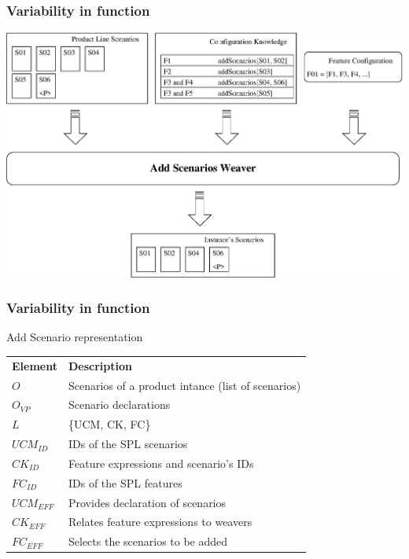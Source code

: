 \documentclass[xcolor=svgnames]{beamer}
\begin{document}
\begin{frame}
\frametitle{Variability in function}
\begin{center}
\includegraphics[scale=0.40]{img/select-weaver.eps}
\end{center}
\hyperlink{addScenario-weaver}{}
\end{frame}

\begin{frame}
\frametitle{Variability in function}
\begin{block}{Add Scenario representation }
\begin{scriptsize}
\begin{tabular}{p{0.6in}p{2.4in}}
   \hline\noalign{\smallskip}
  {\bf Element} & {\bf Description} \\
   \noalign{\smallskip}
   \hline
   \noalign{\smallskip}
   $O$             	& Scenarios of a product intance (list of scenarios) \\ 
   $O_{VP}$        	& Scenario declarations \\ 
   $L$             	& \{UCM, CK, FC\} \\ 
   $UCM_{ID}$ 	   	& IDs of the SPL scenarios \\ 
   $CK_{ID}$    	& Feature expressions and scenario's IDs\\  
   $FC_{ID}$    	& IDs of the SPL features \\ 
   $UCM_{EFF}$ 		& Provides declaration of scenarios \\  
   $CK_{EFF}$    	& Relates feature expressions to weavers \\ 
   $FC_{EFF}$    	& Selects the scenarios to be added \\
   \hline
  \end{tabular}
\end{scriptsize}
\end{block}
\end{frame}
\end{document}
